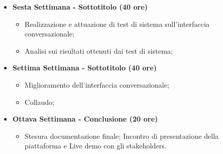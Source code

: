 {\begin{itemize}
        \begin{itemize}
            \item Realizzazione dell'interfaccia conversazionale;
            \item Realizzazione o interazione di servizi di gestione;
        \end{itemize}
        \item \textbf{Sesta Settimana - Sottotitolo (40 ore)} 
        \begin{itemize}
            \item Realizzazione e attuazione di test di sistema sull'interfaccia conversazionale;
            \item Analisi sui risultati ottenuti dai test di sistema;
        \end{itemize}
        \item \textbf{Settima Settimana - Sottotitolo (40 ore)} 
        \begin{itemize}
            \item Miglioramento dell'interfaccia conversazionale;
            \item Collaudo;
        \end{itemize}
        \item \textbf{Ottava Settimana - Conclusione (20 ore)} 
        \begin{itemize}
            \item Stesura documentazione finale;
            Incontro di presentazione della piattaforma e Live demo con gli stakeholders.
        \end{itemize}
    \end{itemize}
}

\newcommand{\totaleOre}{300}

\newcommand{\obiettiviObbligatori}{
	 \item \underline{\textit{O01}}: Realizzazione interfaccia conversazionale completa descritta in fase di analisi con eventuale servizio di gestione simulato.
}

\newcommand{\obiettiviDesiderabili}{
	 \item \underline{\textit{D01}}: Realizzazione del servizio di gestione compresa l'interazione con un database.
}

\newcommand{\obiettiviFacoltativi}{
	 \item \underline{\textit{F01}}: Orchestrazione con i servizi esterni (per esempio, invio notifiche sms).
}